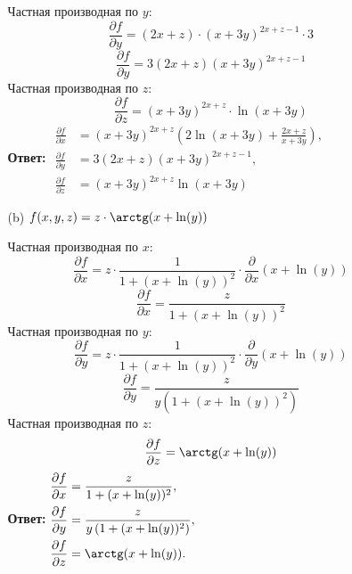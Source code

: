 \documentclass[a4paper]{article}
\begin{document}
\begin{enumerate}
\begin{enumerate}
        Частная производная по $ y $:
        \[
        \frac{\partial f}{\partial y} = (2x + z) \cdot (x + 3y)^{2x + z - 1} \cdot 3
        \]
        \[
        \frac{\partial f}{\partial y} = 3(2x + z)(x + 3y)^{2x + z - 1}
        \]
        Частная производная по $ z $:
        \[
        \frac{\partial f}{\partial z} = (x + 3y)^{2x + z} \cdot \ln(x + 3y)
        \]
        \textbf{Ответ: } 
        $\begin{aligned}
        \frac{\partial f}{\partial x} &= (x + 3y)^{2x + z} \left( 2 \ln(x + 3y) + \frac{2x + z}{x + 3y} \right), \\
        \frac{\partial f}{\partial y} &= 3(2x + z)(x + 3y)^{2x + z - 1}, \\
        \frac{\partial f}{\partial z} &= (x + 3y)^{2x + z} \ln(x + 3y)
        \end{aligned}$\\

        \item[(b)]$ f(x, y, z) = z\cdot \arctg(x+\ln(y)) $
        
        Частная производная по \( x \):
        \[
        \frac{\partial f}{\partial x} = z \cdot \frac{1}{1 + (x + \ln(y))^2} \cdot \frac{\partial}{\partial x}(x + \ln(y))
        \]
        \[
        \frac{\partial f}{\partial x} = \frac{z}{1 + (x + \ln(y))^2}
        \]
        Частная производная по \( y \):
        \[
        \frac{\partial f}{\partial y} = z \cdot \frac{1}{1 + (x + \ln(y))^2} \cdot \frac{\partial}{\partial y}(x + \ln(y))
        \]
        \[
        \frac{\partial f}{\partial y} = \frac{z}{y \left(1 + (x + \ln(y))^2\right)}
        \]
        Частная производная по \( z \):
        \[
        \frac{\partial f}{\partial z} = \arctg(x + \ln(y))
        \]
        \textbf{Ответ: } $\begin{aligned}
            \frac{\partial f}{\partial x} &= \frac{z}{1 + (x + \ln(y))^2}, \\
            \frac{\partial f}{\partial y} &= \frac{z}{y \left(1 + (x + \ln(y))^2\right)}, \\
            \frac{\partial f}{\partial z} &= \arctg(x + \ln(y)).
            \end{aligned}$
    \end{enumerate}


\end{enumerate}
\end{document}

